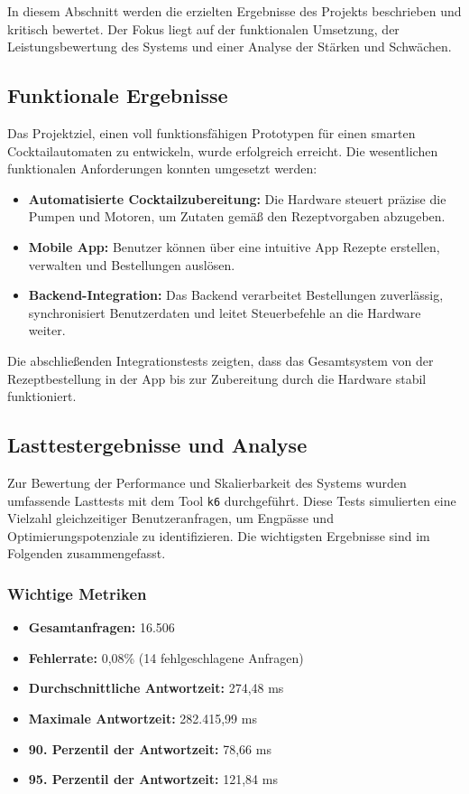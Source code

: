 In diesem Abschnitt werden die erzielten Ergebnisse des Projekts beschrieben und kritisch bewertet. Der Fokus liegt auf der funktionalen Umsetzung, der Leistungsbewertung des Systems und einer Analyse der Stärken und Schwächen.

\subsection{Funktionale Ergebnisse}

Das Projektziel, einen voll funktionsfähigen Prototypen für einen smarten Cocktailautomaten zu 
entwickeln, wurde erfolgreich erreicht. Die wesentlichen funktionalen Anforderungen konnten 
umgesetzt werden:

\begin{itemize}
  \item \textbf{Automatisierte Cocktailzubereitung:} Die Hardware steuert präzise die \\Pumpen und 
  Motoren, um Zutaten gemäß den Rezeptvorgaben abzugeben.
  \item \textbf{Mobile App:} Benutzer können über eine intuitive App Rezepte erstellen, verwalten 
  und Bestellungen auslösen.
  \item \textbf{Backend-Integration:} Das Backend verarbeitet Bestellungen zuverlässig, 
  \\synchronisiert Benutzerdaten und leitet Steuerbefehle an die Hardware \\weiter.
\end{itemize}

Die abschließenden Integrationstests zeigten, dass das Gesamtsystem von der Rezeptbestellung in der 
App bis zur Zubereitung durch die Hardware stabil \\funktioniert.

\subsection{Lasttestergebnisse und Analyse}

Zur Bewertung der Performance und Skalierbarkeit des Systems wurden umfassende Lasttests mit dem 
Tool \texttt{k6} durchgeführt. Diese Tests simulierten eine Vielzahl gleichzeitiger 
Benutzeranfragen, um Engpässe und Optimierungspotenziale zu identifizieren. Die wichtigsten 
Ergebnisse sind im Folgenden zusammengefasst.

\subsubsection*{Wichtige Metriken}
\begin{itemize}
    \item \textbf{Gesamtanfragen:} 16.506
    \item \textbf{Fehlerrate:} 0,08\% (14 fehlgeschlagene Anfragen)
    \item \textbf{Durchschnittliche Antwortzeit:} 274,48 ms
    \item \textbf{Maximale Antwortzeit:} 282.415,99 ms
    \item \textbf{90. Perzentil der Antwortzeit:} 78,66 ms
    \item \textbf{95. Perzentil der Antwortzeit:} 121,84 ms
\end{itemize}

